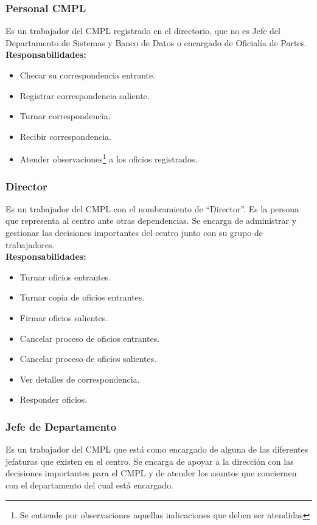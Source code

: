\subsubsection{Personal CMPL}
Es un trabajador del CMPL registrado en el directorio, que no es Jefe del Departamento de Sistemas y Banco de Datos o encargado de Oficialía de Partes.\\

\textbf{Responsabilidades:}
\begin{itemize}
	\item Checar su correspondencia entrante.
	\item Registrar correspondencia saliente.
	\item Turnar correspondencia.
	\item Recibir correspondencia.
	\item Atender observaciones\footnote{Se entiende por observaciones aquellas indicaciones que deben ser atendidas} a los oficios registrados.
\end{itemize}

\subsubsection{Director}
Es un trabajador del CMPL con el nombramiento de “Director”. Es la persona que representa al centro ante otras dependencias. Se encarga de administrar y gestionar las decisiones importantes del centro junto con su grupo de trabajadores.\\

\textbf{Responsabilidades:}
\begin{itemize}
	\item Turnar oficios entrantes.
	\item Turnar copia de oficios entrantes.
	\item Firmar oficios salientes.
	\item Cancelar proceso de oficios entrantes.
	\item Cancelar proceso de oficios salientes.
	\item Ver detalles de correspondencia.
	\item Responder oficios.
\end{itemize}

\subsubsection{Jefe de Departamento}
Es un trabajador del CMPL que está como encargado de alguna de las diferentes jefaturas que existen en el centro. Se encarga de apoyar a la dirección con las decisiones importantes para el CMPL y de atender los asuntos que conciernen con el departamento del cual está encargado.\\

